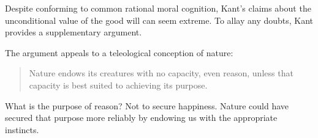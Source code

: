 
Despite conforming to common rational moral cognition, Kant’s claims about the unconditional value of the good will can seem extreme. To allay any doubts, Kant provides a supplementary argument.

The argument appeals to a teleological conception of nature:

\begin{quote}
	Nature endows its creatures with no capacity, even reason, unless that capacity is best suited to achieving its purpose.
\end{quote}

What is the purpose of reason? Not to secure happiness. Nature could have secured that purpose more reliably by endowing us with the appropriate instincts.

